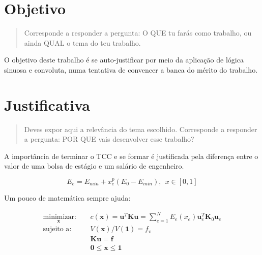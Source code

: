 
\section{Objetivo}

\begin{quote}Corresponde a responder a pergunta: O QUE tu farás como trabalho, ou ainda QUAL o tema do teu trabalho.
\end{quote}

O objetivo deste trabalho é se auto-justificar por meio da aplicação de lógica
sinuosa e convoluta, numa tentativa de convencer a banca do mérito do trabalho.

\section{Justificativa}

\begin{quote}
Deves expor aqui a relevância do tema escolhido. Corresponde a responder a
pergunta: POR QUE vais desenvolver esse trabalho?
\end{quote}

A importância de terminar o TCC e se formar é justificada pela diferença
entre o valor de uma bolsa de estágio e um salário de engenheiro.

\begin{equation}\label{eq:mat}
E_e = E_{min} + x_e^p(E_0 - E_{min}),~~ x \in [0,1]
\end{equation}

Um pouco de matemática sempre ajuda:

\begin{equation}\label{eq:obj}
	\begin{aligned}
		\underset{\mathbf{x}}{\text{minimizar}} :& \quad c(\mathbf{x}) =
			\mathbf{u}^T \mathbf{K u} =
			\sum_{e=1}^N E_e (x_e) \mathbf{u}_e^T \mathbf{K}_0 \mathbf{u}_e\\
		\text{sujeito a} :& \quad V(\mathbf{x})/V(\mathbf{1}) = f_v\\
				  & \quad\mathbf{K u} = \mathbf{f}\\
		    & \quad\mathbf{0} \leq \mathbf{x} \leq \mathbf{1}
	\end{aligned}
\end{equation}


